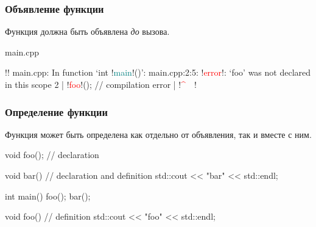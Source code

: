 \documentclass[compress, 8pt]{beamer}
\begin{document}
\begin{frame}[fragile]

    \frametitle{Объявление функции}

    Функция должна быть объявлена \textit{до} вызова.

        {main.cpp}

    \begin{terminalwindow}
!!
main.cpp: In function ‘int !\textcolor{teal}{main}!()’:
main.cpp:2:5: !\textcolor{red}{error}!: ‘foo’ was not declared in this scope
    2 |     !\textcolor{red}{foo}!(); // compilation error
      |     !\textcolor{red}{\^{}~~}!
    \end{terminalwindow}

\end{frame}

\begin{frame}[fragile]

    \frametitle{Определение функции}

    Функция может быть определена как отдельно от объявления, так и вместе с ним.

    \begin{myinplacelisting}[minted language=cpp]
void foo(); // declaration

void bar() { // declaration and definition
    std::cout << "bar" << std::endl;
}

int main() {
    foo();
    bar();
}

void foo() { // definition
    std::cout << "foo" << std::endl;
}
    \end{myinplacelisting}

\end{frame}
\end{document}
